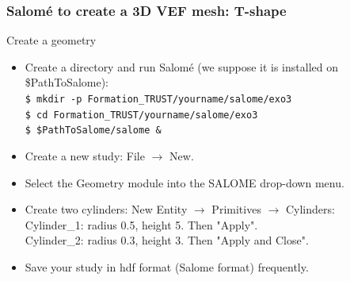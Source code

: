 \documentclass[10pt, hyperref={unicode=true,pdfusetitle, bookmarks=true,bookmarksnumbered=false,bookmarksopen=false, breaklinks=false,pdfborder={0 0 1},backref=true,colorlinks=true,linkcolor=darkblue,pageanchor}]{beamer}
\begin{document}
\begin{frame}
\frametitle{Salom\'e to create a 3D VEF mesh: T-shape}
\begin{block}{Create a geometry}

\begin{itemize}
\item Create a directory and run Salom\'e (we suppose it is installed on \$PathToSalome):\\
\texttt{\$ mkdir -p Formation\_TRUST/yourname/salome/exo3} \\
\texttt{\$ cd Formation\_TRUST/yourname/salome/exo3} \\
\texttt{\$ \$PathToSalome/salome \&} 

\item Create a new study: File $\rightarrow$ New.

\item Select the Geometry module into the SALOME drop-down menu.

\item Create two cylinders: New Entity $\rightarrow$ Primitives $\rightarrow$ Cylinders:\\
Cylinder\_1: radius 0.5, height 5. Then "Apply".\\
Cylinder\_2: radius 0.3, height 3. Then "Apply and Close".
\item Save your study in hdf format (Salome format) frequently.
\end{itemize}

\end{block}
\end{frame}
\end{document}
